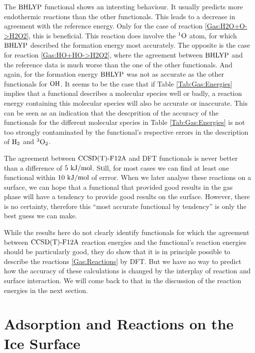 \documentclass[8.5pt,twoside,twocolumn]{article}
\newcommand\singo{\enmat{{^1\te{O}}}}
\newcommand\tripot{\enmat{{^3\ot}}}
\newcommand\kmo{\enmat{\te {kJ/mol}}}
\theoremstyle{standard}
\begin{document}
The $\text{BHLYP}$ functional shows an intersting behaviour. It usually
predicts more endothermic reactions than the other functionals.
This leads to a decrease in agreement with the reference energy.
Only for the case of reaction \eqref{Gas:H2O+O->H2O2}, this is beneficial. This
reaction does involve the $\singo$ atom, for which $\text{BHLYP}$ described the
formation energy most accurately. The opposite is the case for reaction
\eqref{Gas:HO+HO->H2O2}, where the agreement between $\text{BHLYP}$ and the reference
data is much worse than the one of the other functionals. And again, for the
formation energy $\text{BHLYP}$ was not as accurate as the other functionals for
$\text O \text H$. It seems to be the case that if Table \ref{Tab:Gas:Energies} implies
that a functional describes a molecular species well or badly, a reaction
energy containing this molecular species will also be accurate or inaccurate.
This can be seen as an indication that the descprition of the accuracy of the
functionals for the different molecular species in Table \ref{Tab:Gas:Energies}
is not too strongly contaminated by the functional's respective errors in the
description of $\text H_2$ and $\tripot$.

The agreement between $\text{CCSD(T)-F12A}$ and DFT functionals is never better than a
difference of $5~\kmo$. Still, for most cases we can find at least one
functional within $10~\kmo$ of errror. When we later analyse these reactions on
a surface, we can hope that a functional that provided good results in the
gas phase will have a tendency to provide good results on the surface. However,
there is no certainty, therefore this ``most accurate functional by tendency'' is
only the best guess we can make. 

While the results here do not clearly identify functionals for which the
agreement between $\text{CCSD(T)-F12A}$ reaction energies and the functional's reaction
energies should be particularly good, they do show that it is in
principle possible to describe the reactions \eqref{Gas:Reactions} by DFT.
But we have no way to predict how the accuracy of these calculations is changed
by the interplay of reaction and surface interaction. We will come back to
that in the discussion of the reaction energies in the next section.

\section{Adsorption and Reactions on the Ice Surface}
\label{Sec:Ads}
\newcommand\hoht{\enmat{\te{HO}+\te H_2}}
\end{document}
